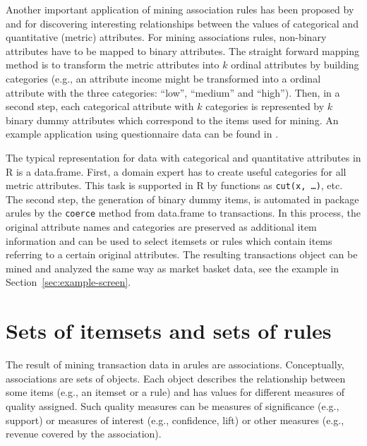 \documentclass[10pt,a4paper]{article}
\newcommand{\strong}[1]{{\normalfont\fontseries{b}\selectfont #1}}
\newcommand{\class}[1]{\textsf{#1}}
\newcommand{\code}[1]{\texttt{#1}}
\newcommand{\pkg}[1]{\strong{#1}}
\newcommand{\proglang}[1]{\textsf{#1}}
\begin{document}
Another important application of mining association rules has been proposed by
\cite{arules:Piatetsky-Shapiro:1991} and \cite{arules:Srikant+Agrawal:1996} for
discovering interesting relationships between the values of categorical and
quantitative (metric) attributes.  For mining associations rules, non-binary
attributes have to be mapped to binary attributes. The straight forward mapping
method is to transform the metric attributes into $k$ ordinal attributes by
building categories (e.g., an attribute income might be transformed into a
ordinal attribute with the three categories: ``low'', ``medium'' and ``high'').
Then, in a second step, each categorical attribute with $k$ categories is
represented by $k$ binary dummy attributes which correspond to the items used
for mining.  An example application using questionnaire data can be found in
\cite{arules:Hastie+Tibshirani+Friedman:2001}.

The typical representation for data with categorical and quantitative
attributes in \proglang{R} is a \class{data.frame}.  First, a domain expert has
to create useful categories for all metric attributes.  This task is
supported in \proglang{R} by functions as \code{cut(x, \ldots)}, etc.  The
second step, the generation of binary dummy items, is automated in package
\pkg{arules} by the \code{coerce} method from \class{data.frame} to
\class{transactions}.  In this process, the original attribute names and
categories are preserved as additional item information and can be used
to select itemsets or rules which contain items referring to a certain original
attributes.  The resulting \class{transactions} object can be mined and
analyzed the same way as market basket data, see the example in
Section~\ref{sec:example-screen}.





\section{Sets of itemsets and sets of rules\label{sec:associations}}

The result of mining transaction data in \pkg{arules} are
\class{associations.} 
Conceptually, associations are sets of 
objects. Each object describes the relationship between some items (e.g., 
an itemset or a rule) and
has values for different measures of quality assigned.
Such quality measures can be measures of significance (e.g., support) 
or measures of interest (e.g., confidence, lift)
or other measures (e.g., revenue covered by the association).
\end{document}
